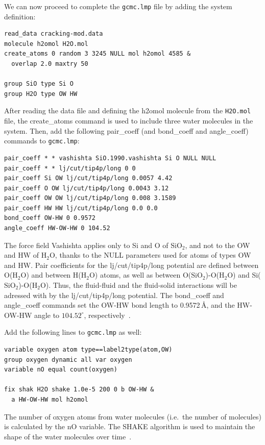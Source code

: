 \documentclass[9pt,tutorial]{livecoms}
\newcommand{\lmpcmd}[1]{\hspace{0pt}\colorbox{listing}{\textcolor{command}{\small{#1}}}\hspace{0pt}} %
\newcommand{\flecmd}[1]{\textcolor{command}{\texttt{#1}}} %
\begin{document}
We can now proceed to complete the \flecmd{gcmc.lmp} file by adding the system definition:
\begin{lstlisting}
read_data cracking-mod.data
molecule h2omol H2O.mol
create_atoms 0 random 3 3245 NULL mol h2omol 4585 &
  overlap 2.0 maxtry 50

group SiO type Si O
group H2O type OW HW
\end{lstlisting}
After reading the data file and defining the \lmpcmd{h2omol} molecule from the \flecmd{H2O.mol}
file, the \lmpcmd{create\_atoms} command is used to include three water molecules
in the system.  Then, add the following \lmpcmd{pair\_coeff} (and
\lmpcmd{bond\_coeff} and \lmpcmd{angle\_coeff}) commands
to \flecmd{gcmc.lmp}:
\begin{lstlisting}
pair_coeff * * vashishta SiO.1990.vashishta Si O NULL NULL
pair_coeff * * lj/cut/tip4p/long 0 0
pair_coeff Si OW lj/cut/tip4p/long 0.0057 4.42
pair_coeff O OW lj/cut/tip4p/long 0.0043 3.12
pair_coeff OW OW lj/cut/tip4p/long 0.008 3.1589
pair_coeff HW HW lj/cut/tip4p/long 0.0 0.0
bond_coeff OW-HW 0 0.9572
angle_coeff HW-OW-HW 0 104.52
\end{lstlisting}
The force field Vashishta applies only to \lmpcmd{Si} and \lmpcmd{O} of $\text{SiO}_2$,
and not to the \lmpcmd{OW} and \lmpcmd{HW} of $\text{H}_2\text{O}$, thanks to the \lmpcmd{NULL} parameters
used for atoms of types \lmpcmd{OW} and \lmpcmd{HW}.  Pair coefficients for the \lmpcmd{lj/cut/tip4p/long}
potential are defined between O($\text{H}_2\text{O}$) and between H($\text{H}_2\text{O}$)
atoms, as well as between O($\text{SiO}_2$)-O($\text{H}_2\text{O}$) and
Si($\text{SiO}_2$)-O($\text{H}_2\text{O}$). Thus,  the fluid-fluid and the
fluid-solid interactions will be adressed with by the \lmpcmd{lj/cut/tip4p/long} potential.
The \lmpcmd{bond\_coeff} and \lmpcmd{angle\_coeff} commands set the \lmpcmd{OW-HW}
bond length to 0.9572\,\AA, and the \lmpcmd{HW-OW-HW}
angle to $104.52^\circ$, respectively~\cite{abascal2005general}.

Add the following lines to \flecmd{gcmc.lmp} as well:
\begin{lstlisting}
variable oxygen atom type==label2type(atom,OW)
group oxygen dynamic all var oxygen
variable nO equal count(oxygen)

fix shak H2O shake 1.0e-5 200 0 b OW-HW &
  a HW-OW-HW mol h2omol
\end{lstlisting}
The number of oxygen atoms from water molecules (i.e.~the number of molecules)
is calculated by the \lmpcmd{nO} variable.  The SHAKE algorithm is used to
maintain the shape of the water molecules over time~\cite{ryckaert1977numerical, andersen1983rattle}.
\end{document}
